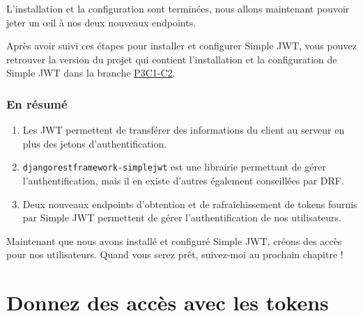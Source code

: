 \documentclass[a4paper]{article}
\begin{document}
L’installation et la configuration sont terminées, nous allons maintenant pouvoir jeter un œil à nos deux nouveaux endpoints.
\begin{theorem}
Après avoir suivi ces étapes pour installer et configurer Simple JWT, vous pouvez retrouver la version du projet qui contient l’installation et la configuration de Simple JWT dans la branche \href{https://github.com/OpenClassrooms-Student-Center/7192416_APIs_DRF/tree/P3C1-C2}{P3C1-C2}.
\end{theorem}

\subsubsection{En résumé}
\begin{enumerate}
\item Les JWT permettent de transférer des informations du client au serveur en plus des jetons d’authentification.
\item {\tt djangorestframework-simplejwt}  est une librairie permettant de gérer l’authentification, mais il en existe d’autres également conseillées par DRF.
\item Deux nouveaux endpoints d’obtention et de rafraîchissement de tokens fournis par Simple JWT permettent de gérer l’authentification de nos utilisateurs.
\end{enumerate}

Maintenant que nous avons installé et configuré Simple JWT, créons des accès pour nos utilisateurs. Quand vous serez prêt, suivez-moi au prochain chapitre !

\section{Donnez des accès avec les tokens}
\end{document}
